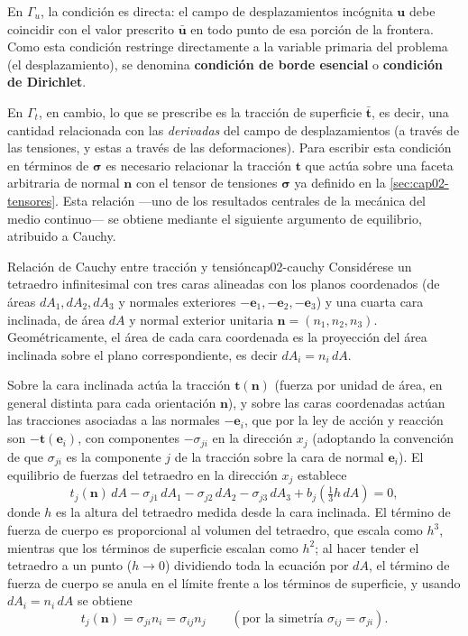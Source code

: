En $\Gamma_u$, la condición es directa: el campo de desplazamientos incógnita $\bm u$ debe coincidir con el valor prescrito $\bar{\bm u}$ en todo punto de esa porción de la frontera. Como esta condición restringe directamente a la variable primaria del problema (el desplazamiento), se denomina \textbf{condición de borde esencial} o \textbf{condición de Dirichlet}.

En $\Gamma_t$, en cambio, lo que se prescribe es la tracción de superficie $\bar{\bm t}$, es decir, una cantidad relacionada con las \emph{derivadas} del campo de desplazamientos (a través de las tensiones, y estas a través de las deformaciones). Para escribir esta condición en términos de $\bm\sigma$ es necesario relacionar la tracción $\bm t$ que actúa sobre una faceta arbitraria de normal $\bm n$ con el tensor de tensiones $\bm\sigma$ ya definido en la \cref{sec:cap02-tensores}. Esta relación —uno de los resultados centrales de la mecánica del medio continuo— se obtiene mediante el siguiente argumento de equilibrio, atribuido a Cauchy.

\begin{teorema}{Relación de Cauchy entre tracción y tensión}{cap02-cauchy}
Considérese un tetraedro infinitesimal con tres caras alineadas con los planos coordenados (de áreas $dA_1, dA_2, dA_3$ y normales exteriores $-\bm e_1,-\bm e_2,-\bm e_3$) y una cuarta cara inclinada, de área $dA$ y normal exterior unitaria $\bm n=(n_1,n_2,n_3)$. Geométricamente, el área de cada cara coordenada es la proyección del área inclinada sobre el plano correspondiente, es decir $dA_i = n_i\,dA$.

Sobre la cara inclinada actúa la tracción $\bm t(\bm n)$ (fuerza por unidad de área, en general distinta para cada orientación $\bm n$), y sobre las caras coordenadas actúan las tracciones asociadas a las normales $-\bm e_i$, que por la ley de acción y reacción son $-\bm t(\bm e_i)$, con componentes $-\sigma_{ji}$ en la dirección $x_j$ (adoptando la convención de que $\sigma_{ji}$ es la componente $j$ de la tracción sobre la cara de normal $\bm e_i$). El equilibrio de fuerzas del tetraedro en la dirección $x_j$ establece
\[
t_j(\bm n)\,dA - \sigma_{j1}\,dA_1 - \sigma_{j2}\,dA_2 - \sigma_{j3}\,dA_3 + b_j\left(\tfrac{1}{3}h\,dA\right) = 0,
\]
donde $h$ es la altura del tetraedro medida desde la cara inclinada. El término de fuerza de cuerpo es proporcional al volumen del tetraedro, que escala como $h^3$, mientras que los términos de superficie escalan como $h^2$; al hacer tender el tetraedro a un punto ($h\to 0$) dividiendo toda la ecuación por $dA$, el término de fuerza de cuerpo se anula en el límite frente a los términos de superficie, y usando $dA_i=n_i\,dA$ se obtiene
\[
t_j(\bm n) = \sigma_{ji}n_i = \sigma_{ij}n_j \qquad (\text{por la simetría } \sigma_{ij}=\sigma_{ji}).
\]
\end{teorema}

